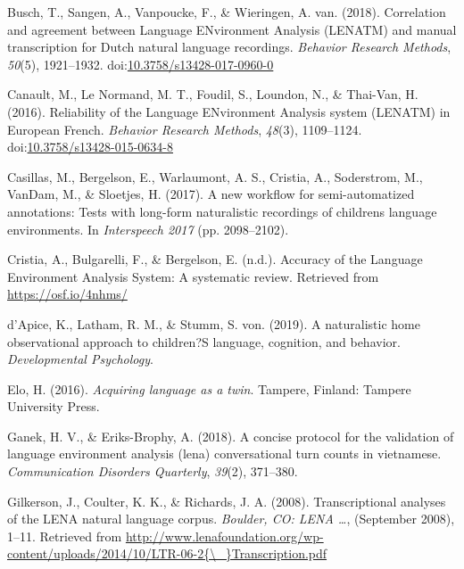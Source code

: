 \documentclass[english,table,man,floatsintext]{apa6}
\begin{document}
\leavevmode\hypertarget{ref-Busch2018}{}%
Busch, T., Sangen, A., Vanpoucke, F., \& Wieringen, A. van. (2018). Correlation and agreement between Language ENvironment Analysis (LENATM) and manual transcription for Dutch natural language recordings. \emph{Behavior Research Methods}, \emph{50}(5), 1921--1932. doi:\href{https://doi.org/10.3758/s13428-017-0960-0}{10.3758/s13428-017-0960-0}

\leavevmode\hypertarget{ref-Canault2016}{}%
Canault, M., Le Normand, M. T., Foudil, S., Loundon, N., \& Thai-Van, H. (2016). Reliability of the Language ENvironment Analysis system (LENATM) in European French. \emph{Behavior Research Methods}, \emph{48}(3), 1109--1124. doi:\href{https://doi.org/10.3758/s13428-015-0634-8}{10.3758/s13428-015-0634-8}

\leavevmode\hypertarget{ref-casillas2017a}{}%
Casillas, M., Bergelson, E., Warlaumont, A. S., Cristia, A., Soderstrom, M., VanDam, M., \& Sloetjes, H. (2017). A new workflow for semi-automatized annotations: Tests with long-form naturalistic recordings of childrens language environments. In \emph{Interspeech 2017} (pp. 2098--2102).

\leavevmode\hypertarget{ref-Cristia}{}%
Cristia, A., Bulgarelli, F., \& Bergelson, E. (n.d.). Accuracy of the Language Environment Analysis System: A systematic review. Retrieved from \url{https://osf.io/4nhms/}

\leavevmode\hypertarget{ref-d2019naturalistic}{}%
d'Apice, K., Latham, R. M., \& Stumm, S. von. (2019). A naturalistic home observational approach to children?S language, cognition, and behavior. \emph{Developmental Psychology}.

\leavevmode\hypertarget{ref-Elo}{}%
Elo, H. (2016). \emph{Acquiring language as a twin}. Tampere, Finland: Tampere University Press.

\leavevmode\hypertarget{ref-ganek2018concise}{}%
Ganek, H. V., \& Eriks-Brophy, A. (2018). A concise protocol for the validation of language environment analysis (lena) conversational turn counts in vietnamese. \emph{Communication Disorders Quarterly}, \emph{39}(2), 371--380.

\leavevmode\hypertarget{ref-Gilkerson2008ltr6}{}%
Gilkerson, J., Coulter, K. K., \& Richards, J. A. (2008). Transcriptional analyses of the LENA natural language corpus. \emph{Boulder, CO: LENA \ldots{}}, (September 2008), 1--11. Retrieved from \href{http://www.lenafoundation.org/wp-content/uploads/2014/10/LTR-06-2\%7B/_\%7DTranscription.pdf}{http://www.lenafoundation.org/wp-content/uploads/2014/10/LTR-06-2\{\textbackslash{}\_\}Transcription.pdf}
\end{document}
